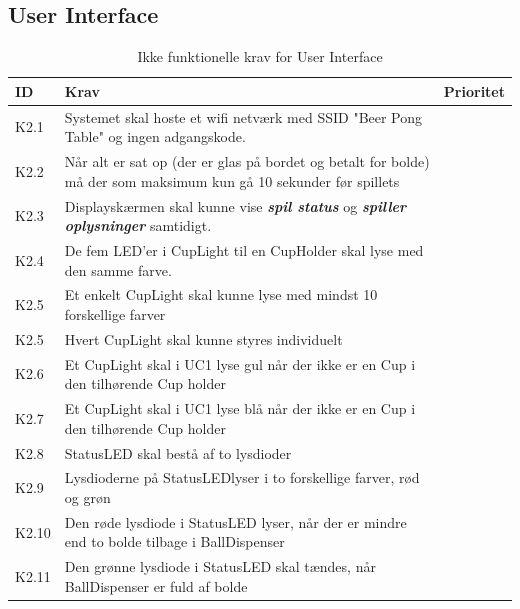 \documentclass[Kravspecifikation/Kravspec_Main.tex]{subfiles}
\begin{document}
\subsection{User Interface}
\begin{table}[H]
\begin{tabular}{|L{0.1\textwidth}|L{0.75\textwidth}|L{0.15\textwidth}|}
\hline
\textbf{ID} & \textbf{Krav} & \textbf{Prioritet} \\ \hline
K2.1 & Systemet skal hoste et wifi netværk med SSID "Beer Pong Table" og ingen adgangskode. & \\ \hline
K2.2 & Når alt er sat op (der er glas på bordet og betalt for bolde) må der som maksimum kun gå 10 sekunder før spillets &  \\ \hline
K2.3 & Displayskærmen skal kunne vise \textit{\textbf{spil status}} og \textit{\textbf{spiller oplysninger}} samtidigt. & \\ \hline
K2.4 & De fem LED'er i CupLight til en CupHolder skal lyse med den samme farve. & \\ \hline
K2.5 & Et enkelt CupLight skal kunne lyse med mindst 10 forskellige farver & \\ \hline
K2.5 & Hvert CupLight skal kunne styres individuelt & \\ \hline 
K2.6 & Et CupLight skal i UC1 lyse gul når der ikke er en Cup i den tilhørende Cup holder  & \\ \hline
K2.7 & Et CupLight skal i UC1 lyse blå når der ikke er en Cup i den tilhørende Cup holder & \\ \hline
K2.8 & StatusLED skal bestå af to lysdioder &  \\ \hline
K2.9 & Lysdioderne på StatusLEDlyser i to forskellige farver, rød og grøn &  \\ \hline
K2.10 & Den røde lysdiode i StatusLED lyser, når der er mindre end to bolde tilbage i BallDispenser &  \\ \hline
K2.11 & Den grønne lysdiode i StatusLED skal tændes, når BallDispenser er fuld af bolde &  \\ \hline
\end{tabular}
\caption{Ikke funktionelle krav for User Interface}
\label{tab:user_interface}
\end{table}
\end{document}
